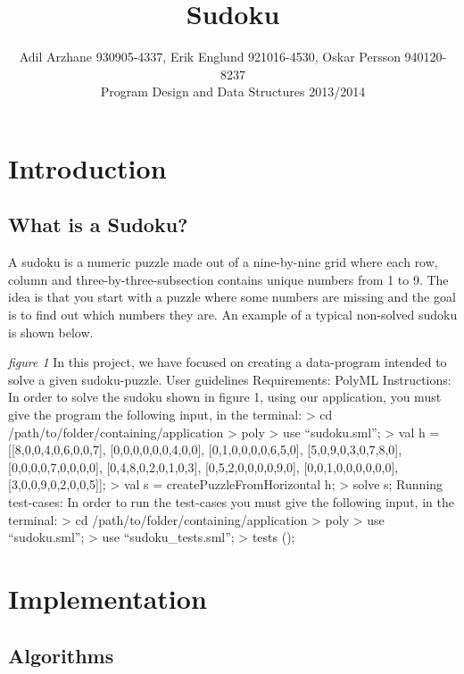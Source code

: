 \documentclass[12pt, a4paper]{report}
\title{Sudoku}
\author{Adil Arzhane 930905-4337, Erik Englund 921016-4530, Oskar Persson 940120-8237\\Program Design and Data Structures 2013/2014}
\begin{document}
\maketitle
\tableofcontents







\section{Introduction}
\subsection{What is a Sudoku?}
A sudoku is a numeric puzzle made out of a nine-by-nine grid where each row, column and three-by-three-subsection contains unique numbers from 1 to 9. The idea is that you start with a puzzle where some numbers are missing and the goal is to find out which numbers they are. An example of a typical non-solved sudoku is shown below.


\textit{figure 1}
In this project, we have focused on creating a data-program intended to solve a given sudoku-puzzle.
User guidelines
Requirements: PolyML
Instructions: In order to solve the sudoku shown in figure 1, using our application, you must give the program the following input, in the terminal:
> cd /path/to/folder/containing/application
> poly
> use “sudoku.sml”;
> val h = [[8,0,0,4,0,6,0,0,7],
           [0,0,0,0,0,0,4,0,0],
	     [0,1,0,0,0,0,6,5,0],
           [5,0,9,0,3,0,7,8,0],
           [0,0,0,0,7,0,0,0,0],
	     [0,4,8,0,2,0,1,0,3],
           [0,5,2,0,0,0,0,9,0],
           [0,0,1,0,0,0,0,0,0],
           [3,0,0,9,0,2,0,0,5]];
> val s = createPuzzleFromHorizontal h;
> solve s;
Running test-cases: In order to run the test-cases you must give the following input, in the terminal:
> cd /path/to/folder/containing/application
> poly
> use “sudoku.sml”;
> use “sudoku_tests.sml”;
> tests ();
\section{Implementation}
\subsection{Algorithms}
\end{document}
